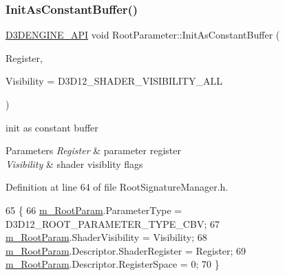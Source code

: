 \subsubsection{\texorpdfstring{Init\+As\+Constant\+Buffer()}{InitAsConstantBuffer()}}
{\footnotesize\ttfamily \mbox{\hyperlink{stdafx_8h_a8ee2d990c5dfba7794dd2b60741d7722}{D3\+D\+E\+N\+G\+I\+N\+E\+\_\+\+A\+PI}} void Root\+Parameter\+::\+Init\+As\+Constant\+Buffer (\begin{DoxyParamCaption}\item[{U\+I\+NT}]{Register,  }\item[{D3\+D12\+\_\+\+S\+H\+A\+D\+E\+R\+\_\+\+V\+I\+S\+I\+B\+I\+L\+I\+TY}]{Visibility = {\ttfamily D3D12\+\_\+SHADER\+\_\+VISIBILITY\+\_\+ALL} }\end{DoxyParamCaption})\hspace{0.3cm}{\ttfamily [inline]}}



init as constant buffer 


\begin{DoxyParams}{Parameters}
{\em Register} & parameter register \\
\hline
{\em Visibility} & shader visiblity flags \\
\hline
\end{DoxyParams}


Definition at line 64 of file Root\+Signature\+Manager.\+h.


\begin{DoxyCode}
65     \{
66         \mbox{\hyperlink{class_root_parameter_a66f26d4bb3cd092c625bc083c508fe40}{m\_RootParam}}.ParameterType = D3D12\_ROOT\_PARAMETER\_TYPE\_CBV;
67         \mbox{\hyperlink{class_root_parameter_a66f26d4bb3cd092c625bc083c508fe40}{m\_RootParam}}.ShaderVisibility = Visibility;
68         \mbox{\hyperlink{class_root_parameter_a66f26d4bb3cd092c625bc083c508fe40}{m\_RootParam}}.Descriptor.ShaderRegister = Register;
69         \mbox{\hyperlink{class_root_parameter_a66f26d4bb3cd092c625bc083c508fe40}{m\_RootParam}}.Descriptor.RegisterSpace = 0;
70     \}
\end{DoxyCode}
\mbox{\label{class_root_parameter_a7477d1b81ca872aa6ca16a71bbafc500}} 
